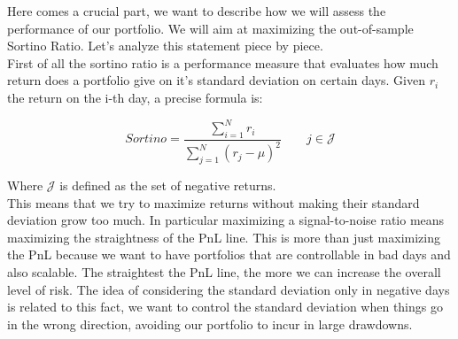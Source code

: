 Here comes a crucial part, we want to describe how we will assess the performance of our portfolio. We will aim at maximizing the out-of-sample Sortino Ratio. Let's analyze this statement piece by piece.\\
First of all the sortino ratio is a performance measure that evaluates how much return does a portfolio give on it's standard deviation on certain days. Given $r_i$ the return on the i-th day, a precise formula is:

$$
Sortino = \displaystyle \frac{\sum\limits_{i=1}^N r_i}{\sum\limits_{j=1}^N (r_j - \mu)^2} \qquad j \in \mathcal{J}
$$ 

Where $\mathcal{J}$ is defined as the set of negative returns.\\
This means that we try to maximize returns without making their standard deviation grow too much. In particular maximizing a signal-to-noise ratio means maximizing the straightness of the PnL line. This is more than just maximizing the PnL because we want to have portfolios that are controllable in bad days and also scalable. The straightest the PnL line, the more we can increase the overall level of risk. The idea of considering the standard deviation only in negative days is related to this fact, we want to control the standard deviation when things go in the wrong direction, avoiding our portfolio to incur in large drawdowns.